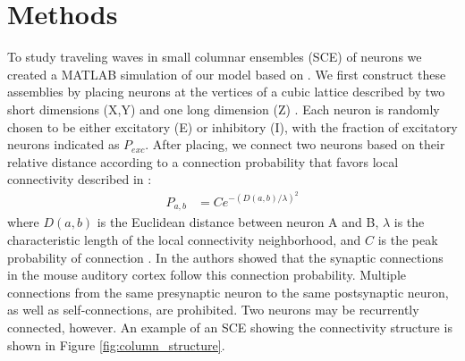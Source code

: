 \documentclass[12pt]{article}
\begin{document}
\section{Methods}
To study traveling waves in small columnar ensembles (SCE) of neurons  we created a MATLAB simulation of our model based on \parencite{izhikevich2003}  . 
We first construct these assemblies by placing neurons at the vertices of a cubic lattice described by two short   dimensions (X,Y) and one long dimension (Z) . 
Each neuron is randomly chosen to be either excitatory (E) or inhibitory (I), with the fraction of excitatory neurons indicated as $P_{exc}$.
After placing, we connect two neurons based on their relative distance according to a connection probability that favors local connectivity described in \parencite{maass2002}: 
\begin{align}\label{eq:connectivity}
 P_{a,b} &= C e^{-(D(a,b)/\lambda)^2}
\end{align}
where $D(a,b)$ is the Euclidean distance between neuron A and B, $\lambda$ is the characteristic length of the local connectivity neighborhood, and $C$ is  the peak probability of connection  .
In \parencite{Levy2012} the authors showed that the synaptic connections in the mouse auditory cortex follow this connection probability.
Multiple connections from the same presynaptic neuron to the same postsynaptic neuron, as well as self-connections, are prohibited.
Two neurons may be recurrently connected, however. 
An example of an SCE showing the connectivity structure is shown in Figure \ref{fig:column_structure}.
\end{document}
